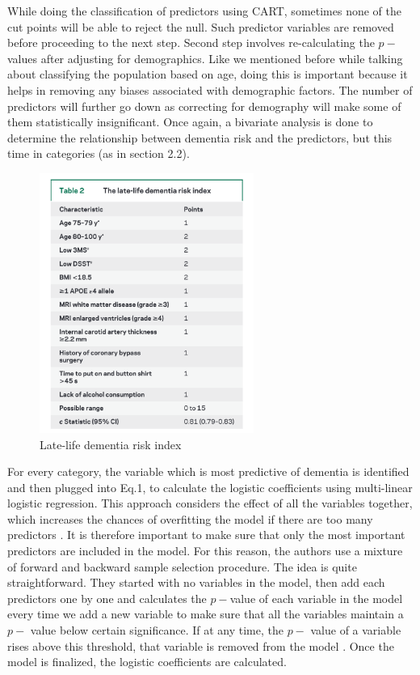 \documentclass[12pt,letterpaper]{article}
\begin{document}
While doing the classification of predictors using CART, sometimes none of the cut points will be able to reject the null. Such predictor variables are removed before proceeding to the next step. Second step involves re-calculating the $p-$values after adjusting for demographics. Like we mentioned before while talking about classifying the population based on age, doing this is important because it helps in removing any biases associated with demographic factors. The number of predictors will further go down as correcting for demography will make some of them statistically insignificant. Once again, a bivariate analysis is done to determine the relationship between dementia risk and the predictors, but this time in categories (as in section 2.2). \\
\begin{figure}
\vspace{-2 mm}
\includegraphics[width=7cm]{riskindex.png}
\caption{Late-life dementia risk index}
\label{risk}
\end{figure}
For every category, the variable which is most predictive of dementia is identified and then plugged into Eq.1, to calculate the logistic coefficients using multi-linear logistic regression. This approach considers the effect of all the variables together, which increases the chances of overfitting the model if there are too many predictors \cite{intro2013}. It is therefore important to make sure that only the most important predictors are included in the model. For this reason, the authors use a mixture of forward and backward sample selection procedure. The idea is quite straightforward. They started with no variables in the model, then add each predictors one by one and calculates the $p-$value of each variable in the model every time we add a new variable to make sure that all the variables maintain a $p-$ value below certain significance. If at any time, the $p-$ value of a variable rises above this threshold, that variable is removed from the model \cite{intro2013}. Once the model is finalized, the logistic coefficients are calculated.
\end{document}
